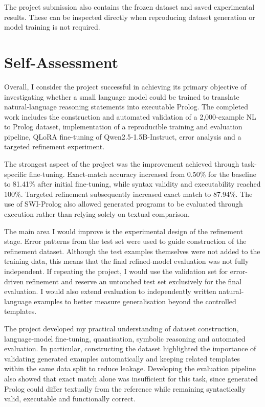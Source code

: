 \documentclass[11pt]{article} %
\theoremstyle{plain}
\theoremstyle{definition}
\begin{document}
The project submission also contains the frozen dataset and saved experimental
results. These can be inspected directly when reproducing dataset generation
or model training is not required.

\clearpage
\section{Self-Assessment}
\label{sec:self-assessment}

Overall, I consider the project successful in achieving its primary objective
of investigating whether a small language model could be trained to translate
natural-language reasoning statements into executable Prolog. The completed
work includes the construction and automated validation of a 2,000-example
NL to Prolog dataset, implementation of a reproducible training and evaluation
pipeline, QLoRA fine-tuning of Qwen2.5-1.5B-Instruct, error analysis and a
targeted refinement experiment.

The strongest aspect of the project was the improvement achieved through
task-specific fine-tuning. Exact-match accuracy increased from 0.50\% for the
baseline to 81.41\% after initial fine-tuning, while syntax validity and
executability reached 100\%. Targeted refinement subsequently increased exact
match to 87.94\%. The use of SWI-Prolog also allowed generated programs to be
evaluated through execution rather than relying solely on textual comparison.

The main area I would improve is the experimental design of the refinement
stage. Error patterns from the test set were used to guide construction of the
refinement dataset. Although the test examples themselves were not added to the
training data, this means that the final refined-model evaluation was not fully
independent. If repeating the project, I would use the validation set for
error-driven refinement and reserve an untouched test set exclusively for the
final evaluation. I would also extend evaluation to independently written
natural-language examples to better measure generalisation beyond the
controlled templates.

The project developed my practical understanding of dataset construction,
language-model fine-tuning, quantisation, symbolic reasoning and
automated evaluation. In particular, constructing the dataset highlighted the
importance of validating generated examples automatically and keeping
related templates within the same data split to reduce leakage. Developing
the evaluation pipeline also showed that exact match alone was insufficient
for this task, since generated Prolog could differ textually from the reference
while remaining syntactically valid, executable and functionally correct.
\end{document}
